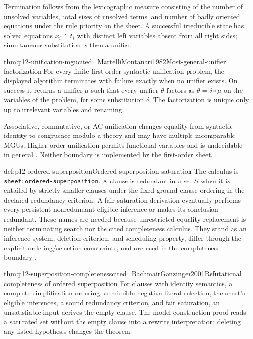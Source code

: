 Termination follows from the lexicographic measure consisting of the number of
unsolved variables, total sizes of unsolved terms, and number of badly oriented
equations under the rule priority on the sheet. A successful irreducible state
has solved equations \(x_i\doteq t_i\) with distinct left variables absent from
all right sides; simultaneous substitution is then a unifier.

\begin{hbtheorem}{thm:p12-unification-mgu}{cited=MartelliMontanari1982}{Most-general-unifier factorization}
For every finite first-order syntactic unification problem, the displayed
algorithm terminates with failure exactly when no unifier exists. On success it
returns a unifier \(\mu\) such that every unifier \(\theta\) factors as
\(\theta=\delta\circ\mu\) on the variables of the problem, for some
substitution \(\delta\). The factorization is unique only up to irrelevant
variables and renaming.
\end{hbtheorem}

Associative, commutative, or AC-unification changes equality from syntactic
identity to congruence modulo a theory and may have multiple incomparable MGUs.
Higher-order unification permits functional variables and is undecidable in
general \cite{Goldfarb1981}. Neither boundary is implemented by the first-order
sheet.

\begin{hbdefinition}{def:p12-ordered-superposition}{Ordered-superposition saturation}
The calculus is
\hyperref[sheet:ordered-superposition]{\texttt{sheet:ordered-superposition}}.
A clause is redundant in a set \(S\) when it is entailed by strictly smaller
clauses under the fixed ground-clause ordering in the declared redundancy
criterion. A fair saturation derivation eventually performs every persistent
nonredundant eligible inference or makes its conclusion redundant. These names
are needed because unrestricted equality replacement is neither terminating
search nor the cited completeness calculus. They stand as an inference system,
deletion criterion, and scheduling property, differ through the explicit
ordering/selection constraints, and are used in the completeness boundary
\cite{BachmairGanzinger2001,NieuwenhuisRubio2001}.
\end{hbdefinition}

\begin{hbtheorem}{thm:p12-superposition-completeness}{cited=BachmairGanzinger2001}{Refutational completeness of ordered superposition}
For clauses with identity semantics, a complete simplification ordering,
admissible negative-literal selection, the sheet's eligible inferences, a
sound redundancy criterion, and fair saturation, an unsatisfiable input
derives the empty clause. The model-construction proof reads a saturated set
without the empty clause into a rewrite interpretation; deleting any listed
hypothesis changes the theorem.
\end{hbtheorem}

